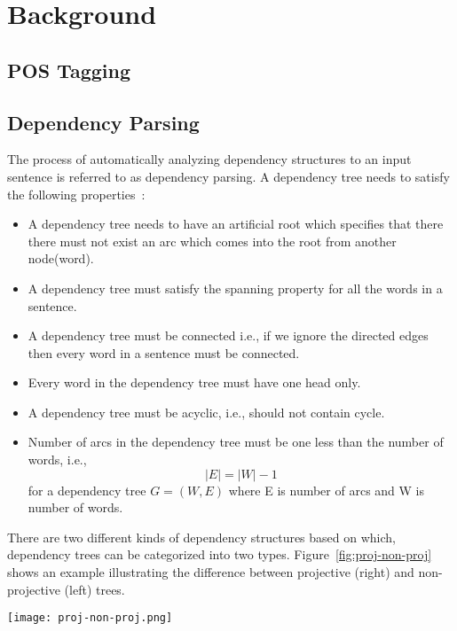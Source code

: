 \chapter{Background}


\section{POS Tagging}



\section{Dependency Parsing}

The process of automatically analyzing dependency structures to an input sentence is referred to as dependency parsing. A dependency tree needs to satisfy the following properties~\cite{kubler2009dependency}:
\begin{itemize}
\item A dependency tree needs to have an artificial root which specifies that there there must not exist an arc which comes into the root from another node(word).
\item A dependency tree must satisfy the spanning property for all the words in a sentence.
\item A dependency tree must be connected i.e., if we ignore the directed edges then every word in a sentence must be connected.
\item Every word in the dependency tree must have one head only.
\item A dependency tree must be acyclic, i.e., should not contain cycle.
\item Number of arcs in the dependency tree must be one less than the number of words, i.e., $$|E| = |W| - 1$$ for a dependency tree $G = (W,E)$ where E is number of arcs and W is number of words.
\end{itemize}

There are two different kinds of dependency structures based on which, dependency trees can be categorized into two types. Figure~\ref{fig:proj-non-proj} shows an example illustrating the difference between projective (right) and non-projective (left) trees.  

\begin{figure*}[!htb]
    \centering
    \texttt{[image: proj-non-proj.png]}
    \centering
    \caption{Projective and Non-projective dependency trees~\cite{kubler2009dependency}}
    \label{fig:proj-non-proj}
\end{figure*}

